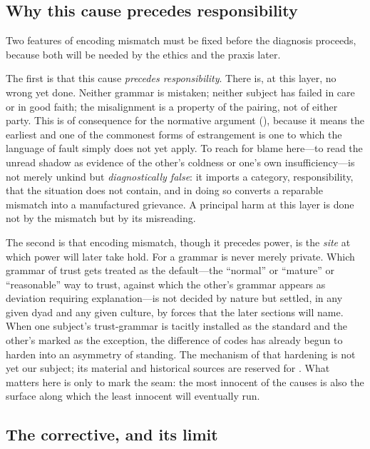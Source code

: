 \subsection{Why this cause precedes responsibility}
\label{p17:sub:encoding-precedes}

Two features of encoding mismatch must be fixed before the diagnosis proceeds, because both will be needed by the ethics and the praxis later.

The first is that this cause \emph{precedes responsibility}. There is, at this layer, no wrong yet done. Neither grammar is mistaken; neither subject has failed in care or in good faith; the misalignment is a property of the pairing, not of either party. This is of consequence for the normative argument (), because it means the earliest and one of the commonest forms of estrangement is one to which the language of fault simply does not yet apply. To reach for blame here---to read the unread shadow as evidence of the other's coldness or one's own insufficiency---is not merely unkind but \emph{diagnostically false}: it imports a category, responsibility, that the situation does not contain, and in doing so converts a reparable mismatch into a manufactured grievance. A principal harm at this layer is done not by the mismatch but by its misreading.

The second is that encoding mismatch, though it precedes power, is the \emph{site} at which power will later take hold. For a grammar is never merely private. Which grammar of trust gets treated as the default---the ``normal'' or ``mature'' or ``reasonable'' way to trust, against which the other's grammar appears as deviation requiring explanation---is not decided by nature but settled, in any given dyad and any given culture, by forces that the later sections will name. When one subject's trust-grammar is tacitly installed as the standard and the other's marked as the exception, the difference of codes has already begun to harden into an asymmetry of standing. The mechanism of that hardening is not yet our subject; its material and historical sources are reserved for . What matters here is only to mark the seam: the most innocent of the causes is also the surface along which the least innocent will eventually run.

\subsection{The corrective, and its limit}
\label{p17:sub:encoding-corrective}

